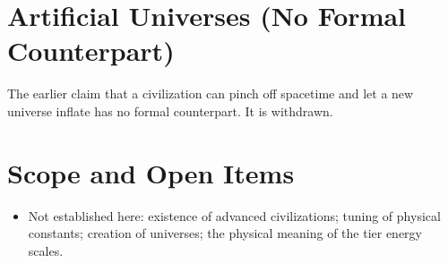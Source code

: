 \documentclass[11pt, a4paper]{article}
\begin{document}
\section{Artificial Universes (No Formal Counterpart)}
The earlier claim that a civilization can pinch off spacetime and let a new universe inflate has no formal counterpart. It is withdrawn.

\section{Scope and Open Items}
\begin{itemize}
  \item Not established here: existence of advanced civilizations; tuning of physical constants; creation of universes; the physical meaning of the tier energy scales.
\end{itemize}
\end{document}
